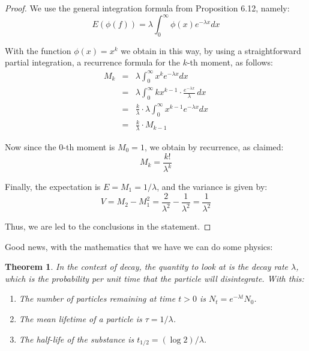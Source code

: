\documentclass[12pt]{amsbook}
\newtheorem{theorem}{Theorem}[chapter]
\begin{document}
\begin{proof}
We use the general integration formula from Proposition 6.12, namely:
$$E(\phi(f))=\lambda\int_0^\infty\phi(x)e^{-\lambda x}dx$$

With the function $\phi(x)=x^k$ we obtain in this way, by using a straightforward partial integration, a recurrence formula for the $k$-th moment, as follows:
\begin{eqnarray*}
M_k
&=&\lambda\int_0^\infty x^ke^{-\lambda x}dx\\
&=&\lambda\int_0^\infty kx^{k-1}\cdot\frac{e^{-\lambda x}}{\lambda}\,dx\\
&=&\frac{k}{\lambda}\cdot\lambda\int_0^\infty x^{k-1}e^{-\lambda x}dx\\
&=&\frac{k}{\lambda}\cdot M_{k-1}
\end{eqnarray*}

Now since the $0$-th moment is $M_0=1$, we obtain by recurrence, as claimed:
$$M_k=\frac{k!}{\lambda^k}$$

Finally, the expectation is $E=M_1=1/\lambda$, and the variance is given by:
$$V=M_2-M_1^2=\frac{2}{\lambda^2}-\frac{1}{\lambda^2}=\frac{1}{\lambda^2}$$

Thus, we are led to the conclusions in the statement.
\end{proof}

Good news, with the mathematics that we have we can do some physics:

\begin{theorem}
In the context of decay, the quantity to look at is the decay rate $\lambda$, which is the probability per unit time that the particle will disintegrate. With this:
\begin{enumerate}
\item The number of particles remaining at time $t>0$ is $N_t=e^{-\lambda t}N_0$.

\item The mean lifetime of a particle is $\tau=1/\lambda$.

\item The half-life of the substance is $t_{1/2}=(\log 2)/\lambda$. 
\end{enumerate}
\end{theorem}
\end{document}
